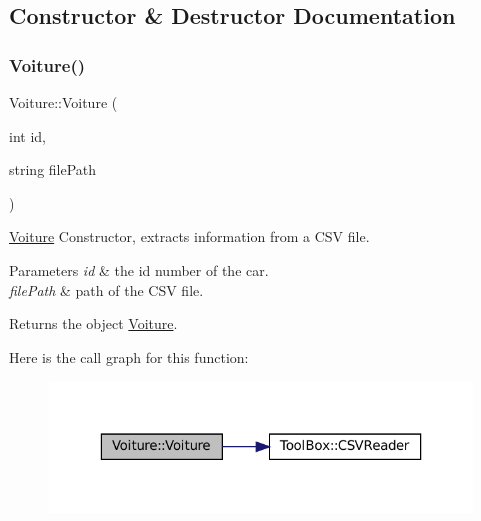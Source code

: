 \subsection{Constructor \& Destructor Documentation}
\mbox{\label{class_voiture_a9f8646dde1dd92d80cf56b975bba97c2}} 
\subsubsection{\texorpdfstring{Voiture()}{Voiture()}\hspace{0.1cm}{\footnotesize\ttfamily [1/2]}}
{\footnotesize\ttfamily Voiture\+::\+Voiture (\begin{DoxyParamCaption}\item[{int}]{id,  }\item[{string}]{file\+Path }\end{DoxyParamCaption})}



\mbox{\hyperlink{class_voiture}{Voiture}} Constructor, extracts information from a C\+SV file. 


\begin{DoxyParams}{Parameters}
{\em id} & the id number of the car. \\
\hline
{\em file\+Path} & path of the C\+SV file. \\
\hline
\end{DoxyParams}
\begin{DoxyReturn}{Returns}
the object \mbox{\hyperlink{class_voiture}{Voiture}}. 
\end{DoxyReturn}
Here is the call graph for this function\+:
\nopagebreak
\begin{figure}[H]
\begin{center}
\leavevmode
\includegraphics[width=323pt]{class_voiture_a9f8646dde1dd92d80cf56b975bba97c2_cgraph}
\end{center}
\end{figure}
\mbox{\label{class_voiture_a77002698169f77149f6bd92f875b86cf}} 
